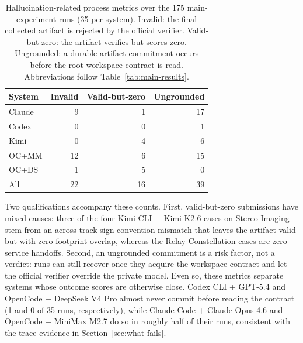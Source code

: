 \documentclass[]{mosi}
\begin{document}
\begin{table}[h]
\centering
\footnotesize
\begin{tabular}{lrrr}
\hline
System & Invalid & Valid-but-zero & Ungrounded \\
\hline
Claude & 9 & 1 & 17 \\
Codex & 0 & 0 & 1 \\
Kimi & 0 & 4 & 6 \\
OC+MM & 12 & 6 & 15 \\
OC+DS & 1 & 5 & 0 \\
\hline
All & 22 & 16 & 39 \\
\hline
\end{tabular}
\caption{Hallucination-related process metrics over the 175 main-experiment runs (35 per system). Invalid: the final collected artifact is rejected by the official verifier. Valid-but-zero: the artifact verifies but scores zero. Ungrounded: a durable artifact commitment occurs before the root workspace contract is read. Abbreviations follow Table~\ref{tab:main-results}.}
\label{tab:hallucination-metrics}
\end{table}

Two qualifications accompany these counts. First, valid-but-zero submissions have mixed causes: three of the four Kimi CLI + Kimi K2.6 cases on Stereo Imaging stem from an across-track sign-convention mismatch that leaves the artifact valid but with zero footprint overlap, whereas the Relay Constellation cases are zero-service handoffs. Second, an ungrounded commitment is a risk factor, not a verdict: runs can still recover once they acquire the workspace contract and let the official verifier override the private model. Even so, these metrics separate systems whose outcome scores are otherwise close. Codex CLI + GPT-5.4 and OpenCode + DeepSeek V4 Pro almost never commit before reading the contract (1 and 0 of 35 runs, respectively), while Claude Code + Claude Opus 4.6 and OpenCode + MiniMax M2.7 do so in roughly half of their runs, consistent with the trace evidence in Section~\ref{sec:what-fails}.
\end{document}
